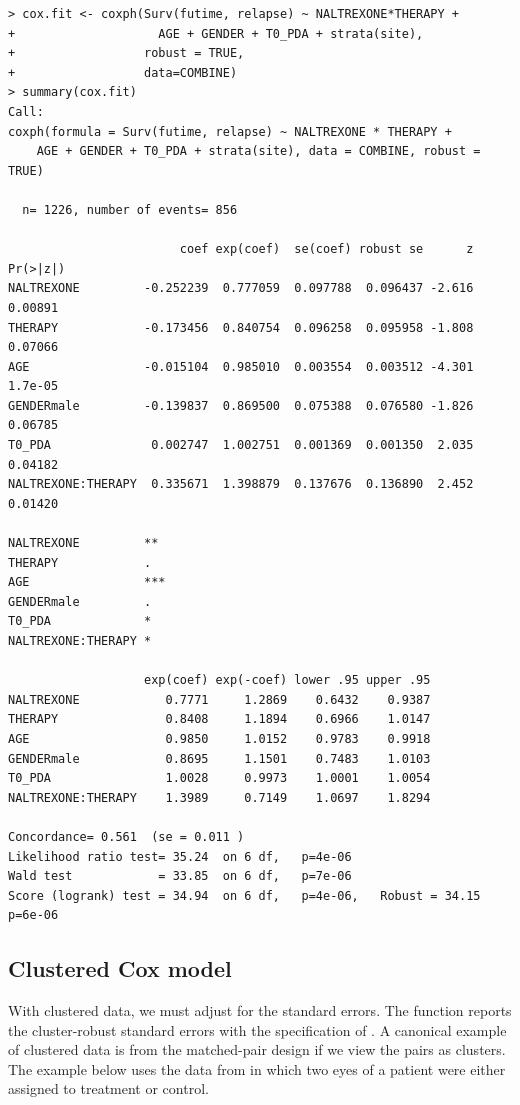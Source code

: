 \begin{lstlisting}
> cox.fit <- coxph(Surv(futime, relapse) ~ NALTREXONE*THERAPY + 
+                    AGE + GENDER + T0_PDA + strata(site), 
+                  robust = TRUE, 
+                  data=COMBINE)
> summary(cox.fit)
Call:
coxph(formula = Surv(futime, relapse) ~ NALTREXONE * THERAPY + 
    AGE + GENDER + T0_PDA + strata(site), data = COMBINE, robust = TRUE)

  n= 1226, number of events= 856 

                        coef exp(coef)  se(coef) robust se      z Pr(>|z|)
NALTREXONE         -0.252239  0.777059  0.097788  0.096437 -2.616  0.00891
THERAPY            -0.173456  0.840754  0.096258  0.095958 -1.808  0.07066
AGE                -0.015104  0.985010  0.003554  0.003512 -4.301  1.7e-05
GENDERmale         -0.139837  0.869500  0.075388  0.076580 -1.826  0.06785
T0_PDA              0.002747  1.002751  0.001369  0.001350  2.035  0.04182
NALTREXONE:THERAPY  0.335671  1.398879  0.137676  0.136890  2.452  0.01420
                      
NALTREXONE         ** 
THERAPY            .  
AGE                ***
GENDERmale         .  
T0_PDA             *  
NALTREXONE:THERAPY *  

                   exp(coef) exp(-coef) lower .95 upper .95
NALTREXONE            0.7771     1.2869    0.6432    0.9387
THERAPY               0.8408     1.1894    0.6966    1.0147
AGE                   0.9850     1.0152    0.9783    0.9918
GENDERmale            0.8695     1.1501    0.7483    1.0103
T0_PDA                1.0028     0.9973    1.0001    1.0054
NALTREXONE:THERAPY    1.3989     0.7149    1.0697    1.8294

Concordance= 0.561  (se = 0.011 )
Likelihood ratio test= 35.24  on 6 df,   p=4e-06
Wald test            = 33.85  on 6 df,   p=7e-06
Score (logrank) test = 34.94  on 6 df,   p=4e-06,   Robust = 34.15  p=6e-06
\end{lstlisting} 




\subsection{Clustered Cox model}


 With clustered data, we must adjust for the standard errors. The  function reports the cluster-robust standard errors with the specification of . A canonical example of clustered data is from the matched-pair design if we view the pairs as clusters. The example below uses the data from \citet{huster1989modelling} in which two eyes of a patient were either assigned to treatment or control. 
 
